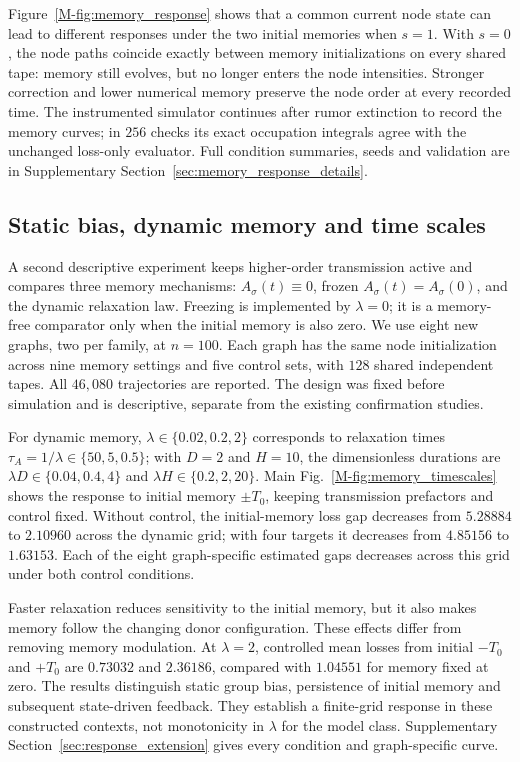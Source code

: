 \documentclass[preprint,11pt,sort&compress]{elsarticle}
\begin{document}
Figure~\ref{M-fig:memory_response} shows that a common current node state can lead to different responses under the two initial memories when $s=1$. With $s=0$, the node paths coincide exactly between memory initializations on every shared tape: memory still evolves, but no longer enters the node intensities. Stronger correction and lower numerical memory preserve the node order at every recorded time. The instrumented simulator continues after rumor extinction to record the memory curves; in $256$ checks its exact occupation integrals agree with the unchanged loss-only evaluator. Full condition summaries, seeds and validation are in Supplementary Section~\ref{sec:memory_response_details}.



\subsection{Static bias, dynamic memory and time scales}
\label{sec:timescales}
A second descriptive experiment keeps higher-order transmission active and compares three memory mechanisms: $A_\sigma(t)\equiv0$, frozen $A_\sigma(t)=A_\sigma(0)$, and the dynamic relaxation law. Freezing is implemented by $\lambda=0$; it is a memory-free comparator only when the initial memory is also zero. We use eight new graphs, two per family, at $n=100$. Each graph has the same node initialization across nine memory settings and five control sets, with $128$ shared independent tapes. All $46,080$ trajectories are reported. The design was fixed before simulation and is descriptive, separate from the existing confirmation studies.

For dynamic memory, $\lambda\in\{0.02,0.2,2\}$ corresponds to relaxation times $\tau_A=1/\lambda\in\{50,5,0.5\}$; with $D=2$ and $H=10$, the dimensionless durations are $\lambda D\in\{0.04,0.4,4\}$ and $\lambda H\in\{0.2,2,20\}$. Main Fig.~\ref{M-fig:memory_timescales} shows the response to initial memory $\pm T_0$, keeping transmission prefactors and control fixed. Without control, the initial-memory loss gap decreases from $5.28884$ to $2.10960$ across the dynamic grid; with four targets it decreases from $4.85156$ to $1.63153$. Each of the eight graph-specific estimated gaps decreases across this grid under both control conditions.

Faster relaxation reduces sensitivity to the initial memory, but it also makes memory follow the changing donor configuration. These effects differ from removing memory modulation. At $\lambda=2$, controlled mean losses from initial $-T_0$ and $+T_0$ are $0.73032$ and $2.36186$, compared with $1.04551$ for memory fixed at zero. The results distinguish static group bias, persistence of initial memory and subsequent state-driven feedback. They establish a finite-grid response in these constructed contexts, not monotonicity in $\lambda$ for the model class. Supplementary Section~\ref{sec:response_extension} gives every condition and graph-specific curve.
\end{document}
